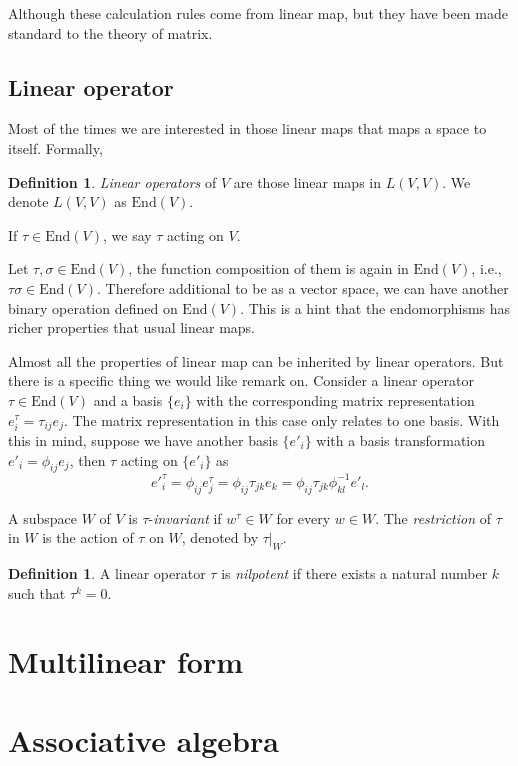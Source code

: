 \documentclass{amsbook}
\theoremstyle{definition}
\newtheorem{definition}[theorem]{Definition}
\theoremstyle{remark}
\newcommand{\End}{\mathrm{End}}
\numberwithin{section}{chapter}
\numberwithin{equation}{chapter}
\begin{document}
Although these calculation rules come from linear map, but they have been made standard to the theory of matrix. 
\section{Linear operator}
Most of the times we are interested in those linear maps that maps a space to itself. Formally, 
\begin{definition}
	\emph{Linear operators} of $V$ are those linear maps in $L(V, V)$. We denote $L(V, V)$ as $\End(V)$.
\end{definition}
If $\tau \in\End(V)$, we say $\tau$ acting on $V$. 

Let $\tau, \sigma \in \End(V)$, the function composition of them is again in $\End(V)$, i.e., $\tau\sigma\in\End(V)$.
Therefore additional to be as a vector space, we can have another binary operation defined on $\End(V)$. This is a hint that the endomorphisms has richer properties that usual linear maps.

Almost all the properties of linear map can be inherited by linear operators. But there is a specific thing we would like remark on. Consider a linear operator $\tau \in\End(V)$ and a basis $\{e_i\}$ with the corresponding matrix representation $e_i^\tau = \tau_{ij}e_j$. The matrix representation in this case only relates to one basis. With this in mind, suppose we have another basis $\{e'_i\}$ with a basis transformation $e'_i = \phi_{ij}e_j$, then $\tau$ acting on $\{e'_i\}$ as
\begin{equation*}
e'^{\tau}_i = \phi_{ij}e_j^{\tau} = \phi_{ij}\tau_{jk}e_k = \phi_{ij}\tau_{jk}\phi^{-1}_{kl}e'_l.
\end{equation*} 

A subspace $W$ of $V$ is $\tau$-\emph{invariant} if $w^\tau \in W$ for every $w \in W$. The \emph{restriction} of $\tau$ in $W$ is the action of $\tau$ on $W$, denoted by $\tau|_W$.

\begin{definition}
	A linear operator $\tau$ is \emph{nilpotent} if there exists a natural number $k$ such that $\tau^k = 0$. 
\end{definition}

\chapter{Multilinear form}


\chapter{Associative algebra}
\end{document}
